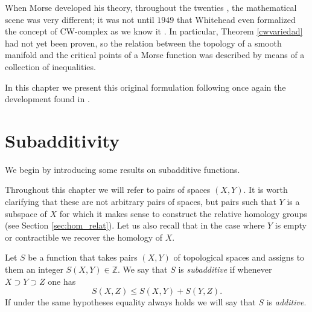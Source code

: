 
When Morse developed his theory, throughout the twenties \cite{BottMarstonMorse}, the mathematical scene was very different; it was not until $1949$ that Whitehead even formalized the concept of CW-complex as we know it \cite{KletteCellComplexesHistory}. In particular, Theorem \ref{cwvariedad} had not yet been proven, so the relation between the topology of a smooth manifold and the critical points of a Morse function was described by means of a collection of inequalities.

In this chapter we present this original formulation following once again the development found in \cite{milnor1963}.

\section{Subadditivity}

We begin by introducing some results on subadditive functions.

Throughout this chapter we will refer to pairs of spaces $(X,Y)$. It is worth clarifying that these are not arbitrary pairs of spaces, but pairs such that $Y$ is a subspace of $X$ for which it makes sense to construct the relative homology groups (see Section \ref{sec:hom_relat}). Let us also recall that in the case where $Y$ is empty or contractible we recover the homology of $X$. %

\begin{definition}
    Let $S$ be a function that takes pairs $(X,Y)$ of topological spaces and assigns to them an integer $S(X,Y)\in \mathbb{Z}$. We say that $S$ is \textit{subadditive} if whenever $X\supset Y\supset Z$ one has
    \begin{equation*}
        S(X,Z) \le S(X,Y) + S(Y,Z).
    \end{equation*}
    If under the same hypotheses equality always holds we will say that $S$ is \textit{additive}.
\end{definition}


